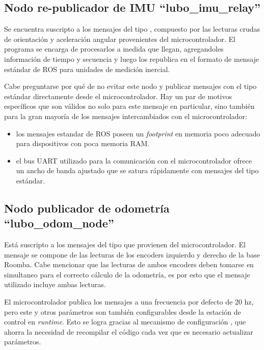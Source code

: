\subsection{Nodo re-publicador de IMU ``lubo\_imu\_relay''}

Se encuentra suscripto a los mensajes del tipo , compuesto por las lecturas crudas de orientación y aceleración angular provenientes del microcontrolador. El programa se encarga de procesarlos a medida que llegan, agregandoles información de tiempo y secuencia y luego los republica en el formato de mensaje estándar de ROS para unidades de medición inercial\protect\footnotemark.

Cabe preguntarse por qué de no evitar este nodo y publicar mensajes con el tipo estándar directamente desde el microcontrolador. Hay un par de motivos específicos que son válidos no solo para este mensaje en particular, sino también para la gran mayoría de los mensajes intercambiados con el microcontrolador:
\begin{itemize}
  \item los mensajes estandar de ROS poseen un \textit{footprint} en memoria poco adecuado para dispositivos con poca memoria RAM.
  \item el bus UART utilizado para la comunicación con el microcontrolador ofrece un ancho de banda ajustado que se satura rápidamente con mensajes del tipo estándar.
\end{itemize}


\subsection{Nodo publicador de odometría ``lubo\_odom\_node''}

Está suscripto a los mensajes del tipo  que provienen del microcontrolador. El mensaje se compone de las lecturas de los encoders izquierdo y derecho de la base Roomba. Cabe mencionar que las lecturas de ambos encoders deben tomarse en simultaneo para el correcto cálculo de la odometría, es por esto que el mensaje utilizado incluye ambas lecturas.

El microcontrolador publica los mensajes a una frecuencia por defecto de 20 hz, pero este y otros parámetros son también configurables desde la estación de control en \textit{runtime}. Esto se logra gracias al mecanismo de configuración , que ahorra la necesidad de recompilar el código cada vez que es necesario actualizar parámetros.

